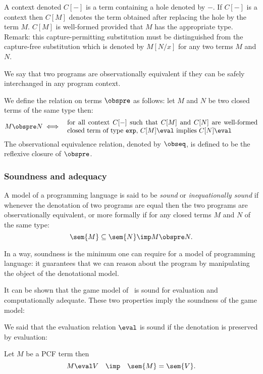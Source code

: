 A context denoted $C[-]$ is a term containing a hole denoted by $-$.
If $C[-]$ is a context then $C[M]$ denotes the term obtained after
replacing the hole by the term $M$. $C[M]$ is well-formed provided
that $M$ has the appropriate type. Remark: this capture-permitting
substitution must be distinguished from the capture-free
substitution which is denoted by $M[N/x]$ for any two terms $M$ and
$N$.

We say that two programs are observationally equivalent if they
can be safely interchanged in any program context.
\begin{definition}
We define the relation on terms $\obspre$ as follows: let $M$ and $N$ be two closed terms of the same type then:
\begin{eqnarray*}
M \obspre N &\iff& \parbox{10cm}{for all context $C[-]$ such that
                $C[M]$ and $C[N]$ are well-formed closed term of type \texttt{exp},
                    $C[M] \eval$ implies $C[N] \eval$}
\end{eqnarray*}
The observational equivalence relation, denoted by $\obseq$, is defined to be the reflexive closure of $\obspre$.
\end{definition}


\subsubsection{Soundness and adequacy}
A model of a programming language is said to be \emph{sound} or
\emph{inequationally sound} if whenever the denotation of two
programs are equal then the two programs are observationally
equivalent, or more formally if for any closed terms $M$ and $N$ of
the same type:
$$ \sem{M} \subseteq \sem{N} \imp M \obspre N.$$

In a way, soundness is the minimum one can require for a model of
programming language: it guarantees that we can reason about the
program by manipulating the object of the denotational model.

It can be shown that the game model of \pcf\ is sound for evaluation
and computationally adequate. These two properties imply the
soundness of the game model:

We said that the evaluation relation $\eval$ is sound if the
denotation is preserved by evaluation:
\begin{lemma}
\label{lem:evalsoundness}
 Let $M$ be a PCF term then
$$M \eval V \quad \imp \quad \sem{M} = \sem{V}.$$
\end{lemma}

